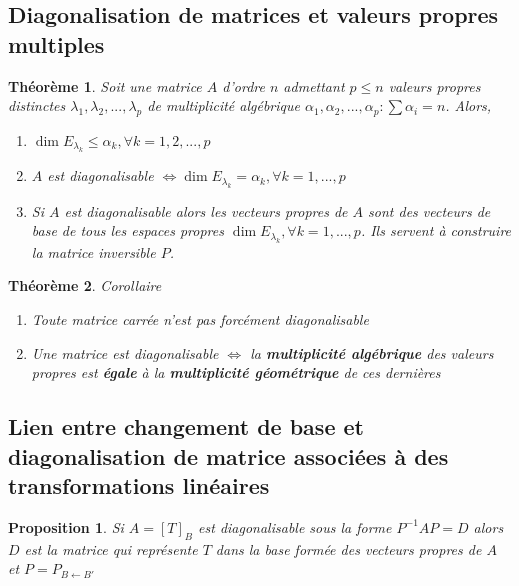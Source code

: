 \documentclass{article}[french, babel]
\newtheorem{myprop}{Proposition}
\newtheorem{mythm}{Théorème}
\begin{document}
	\subsection{Diagonalisation de matrices et valeurs propres multiples}
		\begin{mythm}
			Soit une matrice $A$ d'ordre $n$ admettant $p\leq n$ valeurs propres distinctes $\lambda_1,\lambda_2,...,\lambda_p$ de multiplicité algébrique $\alpha_1,\alpha_2,...,\alpha_p : \sum \alpha_i = n$. Alors,
			\begin{enumerate}
				\item $\dim E_{\lambda_k}\leq\alpha_k, \forall k=1,2,...,p$
				\item $A$ est diagonalisable $\Longleftrightarrow\dim E_{\lambda_k}=\alpha_k,\forall k=1,...,p$
				\item Si $A$ est diagonalisable alors les vecteurs propres de $A$ sont des vecteurs de base de tous les espaces propres $\dim E_{\lambda_k},\forall k=1,...,p$. Ils servent à construire la matrice inversible $P$.
			\end{enumerate}
		\end{mythm}
		\begin{mythm}{Corollaire}
			~
			\begin{enumerate}
				\item Toute matrice carrée n'est pas forcément diagonalisable
				\item Une matrice est diagonalisable $\Longleftrightarrow$ la \textbf{multiplicité algébrique} des valeurs propres est \textbf{égale} à la \textbf{multiplicité géométrique} de ces dernières
			\end{enumerate}
		\end{mythm}
	\subsection{Lien entre changement de base et diagonalisation de matrice associées à des transformations linéaires}
		\begin{myprop}
			Si $A=[T]_B$ est diagonalisable sous la forme $P^{-1}AP=D$ alors $D$ est la matrice qui représente $T$ dans la base formée des vecteurs propres de $A$ et $P=P_{B\leftarrow B'}$
		\end{myprop}
\end{document}

